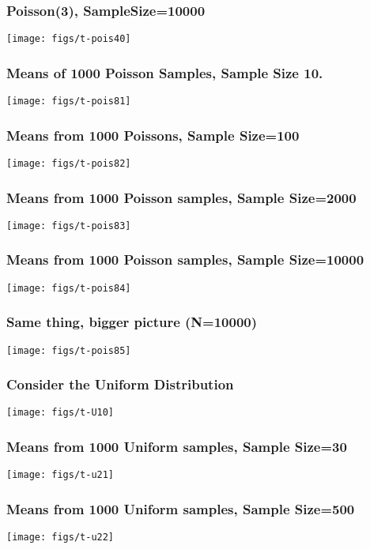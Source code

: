 \documentclass[10pt,english]{beamer}
\begin{document}
\begin{frame}
 \frametitle{Poisson(3), SampleSize=10000 }
 \texttt{[image: figs/t-pois40]}
\end{frame}


\begin{frame}
 \frametitle{Means of 1000 Poisson Samples, Sample Size 10\label{fig:PoissonMeans}.}

 \texttt{[image: figs/t-pois81]}

\end{frame}

\begin{frame}
  \frametitle{Means from 1000 Poissons, Sample Size=100}
 \texttt{[image: figs/t-pois82]}

\end{frame}

\begin{frame}
  \frametitle{Means from 1000 Poisson samples, Sample Size=2000}

 \texttt{[image: figs/t-pois83]}

\end{frame}

\begin{frame}
  \frametitle{Means from 1000 Poisson samples, Sample Size=10000}

 \texttt{[image: figs/t-pois84]}
\end{frame}



\begin{frame}
  \frametitle{Same thing, bigger picture (N=10000)}

 \texttt{[image: figs/t-pois85]}
\end{frame}


\begin{frame}
 \frametitle{Consider the Uniform Distribution}

\texttt{[image: figs/t-U10]}
\end{frame}


\begin{frame}
  \frametitle{Means from 1000 Uniform samples, Sample Size=30}

 \texttt{[image: figs/t-u21]}
\end{frame}


\begin{frame}
  \frametitle{Means from 1000 Uniform samples, Sample Size=500}

 \texttt{[image: figs/t-u22]}
\end{frame}
\end{document}
